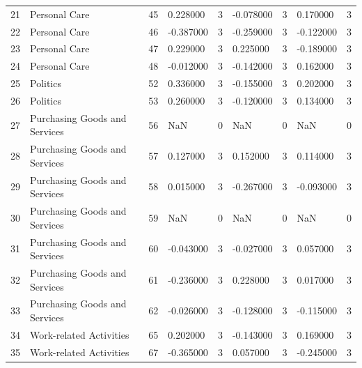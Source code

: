\begin{tabular}{lllllllll}
21 & Personal Care & 45 & 0.228000 & 3 & -0.078000 & 3 & 0.170000 & 3 \\
22 & Personal Care & 46 & -0.387000 & 3 & -0.259000 & 3 & -0.122000 & 3 \\
23 & Personal Care & 47 & 0.229000 & 3 & 0.225000 & 3 & -0.189000 & 3 \\
24 & Personal Care & 48 & -0.012000 & 3 & -0.142000 & 3 & 0.162000 & 3 \\
25 & Politics & 52 & 0.336000 & 3 & -0.155000 & 3 & 0.202000 & 3 \\
26 & Politics & 53 & 0.260000 & 3 & -0.120000 & 3 & 0.134000 & 3 \\
27 & Purchasing Goods and Services & 56 & NaN & 0 & NaN & 0 & NaN & 0 \\
28 & Purchasing Goods and Services & 57 & 0.127000 & 3 & 0.152000 & 3 & 0.114000 & 3 \\
29 & Purchasing Goods and Services & 58 & 0.015000 & 3 & -0.267000 & 3 & -0.093000 & 3 \\
30 & Purchasing Goods and Services & 59 & NaN & 0 & NaN & 0 & NaN & 0 \\
31 & Purchasing Goods and Services & 60 & -0.043000 & 3 & -0.027000 & 3 & 0.057000 & 3 \\
32 & Purchasing Goods and Services & 61 & -0.236000 & 3 & 0.228000 & 3 & 0.017000 & 3 \\
33 & Purchasing Goods and Services & 62 & -0.026000 & 3 & -0.128000 & 3 & -0.115000 & 3 \\
34 & Work-related Activities & 65 & 0.202000 & 3 & -0.143000 & 3 & 0.169000 & 3 \\
35 & Work-related Activities & 67 & -0.365000 & 3 & 0.057000 & 3 & -0.245000 & 3 \\
\bottomrule
\end{tabular}
